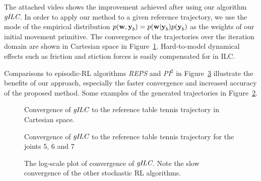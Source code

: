 
The attached video shows the improvement achieved after using our algorithm $\emph{gILC}$. In order to apply our method to a given reference trajectory, we use the mode of the empirical distribution $p(\boldsymbol{\mathrm{w}},\boldsymbol{\mathrm{y}}_b) = p(\boldsymbol{\mathrm{w}}|\boldsymbol{\mathrm{y}}_b)p(\boldsymbol{\mathrm{y}}_b)$ as the weights of our initial movement primitive. The convergence of the trajectories over the iteration domain are shown in Cartesian space in Figure~\ref{ILCTrajectoryTTCartesian}. Hard-to-model dynamical effects such as friction and stiction forces is easily compensated for in ILC.

Comparisons to episodic-RL algorithms \emph{REPS} and \emph{PI$^{2}$} in Figure~\ref{ttComparison} illustrate the benefits of our approach, especially the faster convergence and increased accuracy of the proposed method. Some examples of the generated trajectories in Figure~\ref{ILCTrajectoryTT}. 

\begin{figure}
\center
\scalebox{1.0}{}
\caption{Convergence of $\emph{gILC}$ to the reference table tennis trajectory in Cartesian space.}
\label{ILCTrajectoryTTCartesian}
\end{figure}

\begin{figure}
\center
\scalebox{1.0}{}
\caption{Convergence of $\emph{gILC}$ to the reference table tennis trajectory for the joints 5, 6 and 7}
\label{ILCTrajectoryTT}
\end{figure}

\begin{figure}
\begingroup
\scalebox{0.5}{}
\endgroup
\caption{The log-scale plot of convergence of $\emph{gILC}$. Note the slow convergence of the other stochastic RL algorithms.}
\label{ttComparison}
\end{figure}